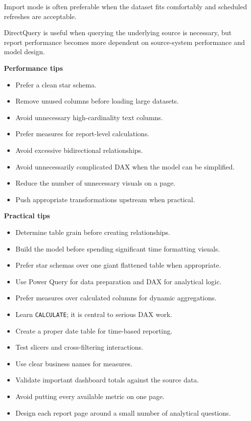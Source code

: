 \documentclass[11pt,letterpaper]{article}
\begin{document}
Import mode is often preferable when the dataset fits comfortably and
scheduled refreshes are acceptable.

DirectQuery is useful when querying the underlying source is necessary, but
report performance becomes more dependent on source-system performance and
model design.



\textbf{Performance tips}

\begin{itemize}[leftmargin=*]
    \item Prefer a clean star schema.
    \item Remove unused columns before loading large datasets.
    \item Avoid unnecessary high-cardinality text columns.
    \item Prefer measures for report-level calculations.
    \item Avoid excessive bidirectional relationships.
    \item Avoid unnecessarily complicated DAX when the model can be simplified.
    \item Reduce the number of unnecessary visuals on a page.
    \item Push appropriate transformations upstream when practical.
\end{itemize}



\textbf{Practical tips}

\begin{itemize}[leftmargin=*]
    \item Determine table grain before creating relationships.
    \item Build the model before spending significant time formatting visuals.
    \item Prefer star schemas over one giant flattened table when appropriate.
    \item Use Power Query for data preparation and DAX for analytical logic.
    \item Prefer measures over calculated columns for dynamic aggregations.
    \item Learn \texttt{CALCULATE}; it is central to serious DAX work.
    \item Create a proper date table for time-based reporting.
    \item Test slicers and cross-filtering interactions.
    \item Use clear business names for measures.
    \item Validate important dashboard totals against the source data.
    \item Avoid putting every available metric on one page.
    \item Design each report page around a small number of analytical questions.
\end{itemize}
\end{document}
